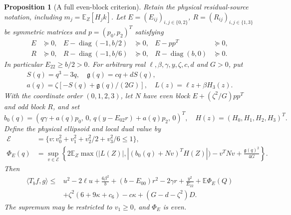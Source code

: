 \documentclass[11pt]{article}
\newtheorem{proposition}[theorem]{Proposition}
\begin{document}
\begin{proposition}[A full even-block criterion]
\label{prop:full-even-r3}
Retain the physical residual-source notation, including
$m_j=\mathbb E_Z[H_jk]$.
Let $E=(E_{ij})_{i,j\in\{0,2\}}$, $R=(R_{ij})_{i,j\in\{1,3\}}$
be symmetric matrices and $p=(p_0,p_2)^T$ satisfying
\begin{align*}
 E&\succeq0,& E-\operatorname{diag}(-1,b/2)&\succeq0,&
 E-pp^T&\succeq0,\\
 R&\succeq0,& R-\operatorname{diag}(-1,b/6)&\succeq0,&
 R-\operatorname{diag}(b,0)&\succeq0.
\end{align*}
In particular $E_{22}\geq b/2>0$.  For arbitrary real
$\ell,\beta,\gamma,y,\zeta,c,d$ and $G>0$, put
\begin{gather*}
 S(q)=q^3-3q,\quad \mathfrak g(q)=cq+dS(q),\\
 a(q)=\zeta[-S(q)+\mathfrak g(q)/(2G)],\quad L(z)=\ell z+\beta H_3(z).
\end{gather*}
With the coordinate order $(0,1,2,3)$, let $N$ have even block
$E+(\zeta^2/G)pp^T$ and odd block $R$, and set
\[
 b_0(q)=(q\gamma+a(q)p_0,\,0,\,
           q(y-E_{02}r)+a(q)p_2,\,0)^T,
 \quad H(z)=(H_0,H_1,H_2,H_3)^T.
\]
Define the physical ellipsoid and local dual value by
\begin{align*}
 \mathcal E&=\{v:v_0^2+v_1^2+v_2^2/2+v_3^2/6\leq1\},\\
 \Phi_E(q)&=\sup_{v\in\mathcal E}\left\{
 2\mathbb E_Z\max\bigl(|L(Z)|,|(b_0(q)+Nv)^TH(Z)|\bigr)
 -v^TNv+\frac{\mathfrak g(q)^2}{4G}\right\}.
\end{align*}
Then
\begin{align*}
 \langle T_bf,g\rangle\leq{}&
 u^2-2\ell u+\frac{6\beta^2}{b}
 +(b-E_{00})r^2-2\gamma r+\frac{y^2}{E_{22}}
 +\mathbb E\Phi_E(Q)\\
 &+\zeta^2(6+9\kappa+c_6)-c\kappa+(G-d-\zeta^2)D.
\end{align*}
The supremum may be restricted to $v_1\geq0$, and $\Phi_E$ is even.
\end{proposition}
\end{document}
